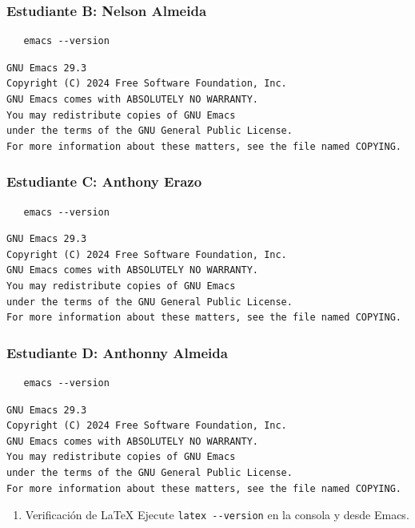 \documentclass{article}
\begin{document}
\subsubsection{Estudiante B: Nelson Almeida}
\label{sec:org57dcd97}

\begin{verbatim}
   emacs --version
\end{verbatim}

\begin{verbatim}
GNU Emacs 29.3
Copyright (C) 2024 Free Software Foundation, Inc.
GNU Emacs comes with ABSOLUTELY NO WARRANTY.
You may redistribute copies of GNU Emacs
under the terms of the GNU General Public License.
For more information about these matters, see the file named COPYING.
\end{verbatim}
\subsubsection{Estudiante C: Anthony Erazo}
\label{sec:org429c223}

\begin{verbatim}
   emacs --version
\end{verbatim}

\begin{verbatim}
GNU Emacs 29.3
Copyright (C) 2024 Free Software Foundation, Inc.
GNU Emacs comes with ABSOLUTELY NO WARRANTY.
You may redistribute copies of GNU Emacs
under the terms of the GNU General Public License.
For more information about these matters, see the file named COPYING.
\end{verbatim}

\subsubsection{Estudiante D: Anthonny Almeida}
\label{sec:org8e46eb7}

\begin{verbatim}
   emacs --version
\end{verbatim}

\begin{verbatim}
GNU Emacs 29.3
Copyright (C) 2024 Free Software Foundation, Inc.
GNU Emacs comes with ABSOLUTELY NO WARRANTY.
You may redistribute copies of GNU Emacs
under the terms of the GNU General Public License.
For more information about these matters, see the file named COPYING.
\end{verbatim}


\begin{enumerate}
\item Verificación de \LaTeX{}
Ejecute \texttt{latex -{}-{}version} en la consola y desde Emacs.
\end{enumerate}
\end{document}
